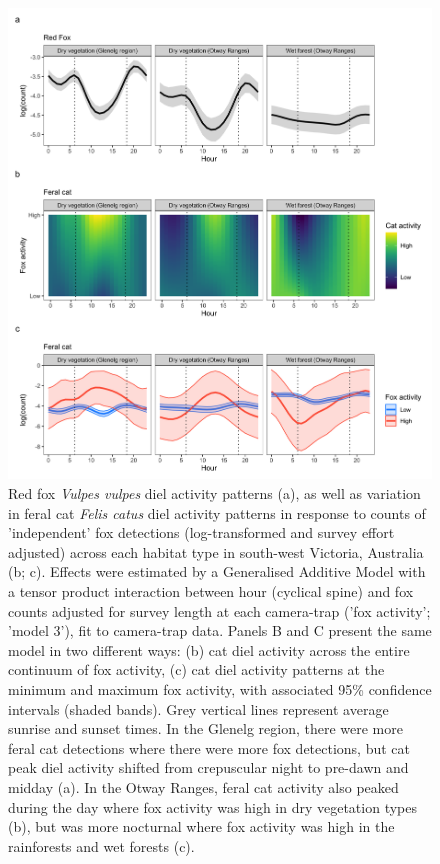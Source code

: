 \documentclass[preprint, 3p, authoryear]{elsarticle} %
\begin{document}
\begin{figure}

{\centering \includegraphics[width=0.8\linewidth]{../figs/cat_fox_count} 

}

\caption{Red fox \textit{Vulpes vulpes} diel activity patterns (a), as well as variation in feral cat \textit{Felis catus} diel activity patterns in response to counts of 'independent' fox detections (log-transformed and survey effort adjusted) across each habitat type in south-west Victoria, Australia (b; c). Effects were estimated by a Generalised Additive Model with a tensor product interaction between hour (cyclical spine) and fox counts adjusted for survey length at each camera-trap ('fox activity'; 'model 3'), fit to camera-trap data. Panels B and C present the same model in two different ways: (b) cat diel activity across the entire continuum of fox activity, (c) cat diel activity patterns at the minimum and maximum fox activity, with associated 95\% confidence intervals (shaded bands). Grey vertical lines represent average sunrise and sunset times. In the Glenelg region, there were more feral cat detections where there were more fox detections, but cat peak diel activity shifted from crepuscular night to pre-dawn and midday (a). In the Otway Ranges, feral cat activity also peaked during the day where fox activity was high in dry vegetation types (b), but was more nocturnal where fox activity was high in the rainforests and wet forests (c).}\label{fig:diel-cat-fox}
\end{figure}
\end{document}
